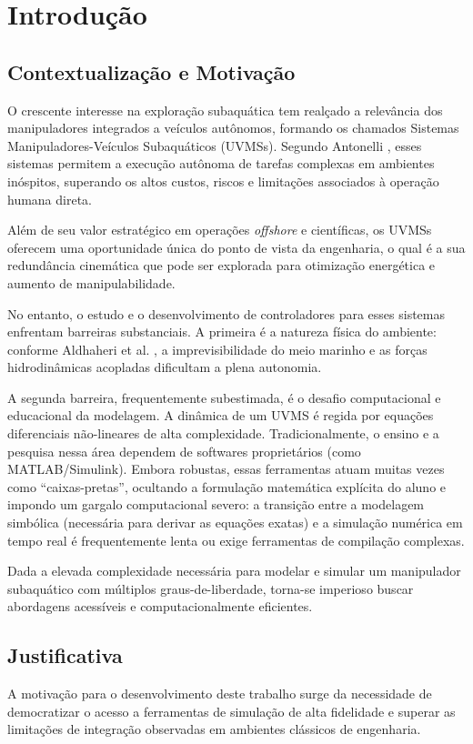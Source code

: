 \chapter{Introdução}

\section{Contextualização e Motivação}
%
O crescente interesse na exploração subaquática tem realçado a relevância dos manipuladores integrados a veículos autônomos, formando os chamados Sistemas Manipuladores-Veículos Subaquáticos (UVMSs). Segundo Antonelli \cite{antonelli2014modelling}, esses sistemas permitem a execução autônoma de tarefas complexas em ambientes inóspitos, superando os altos custos, riscos e limitações associados à operação humana direta. 

Além de seu valor estratégico em operações \textit{offshore} e científicas, os UVMSs oferecem uma oportunidade única do ponto de vista da engenharia, o qual é a sua redundância cinemática que pode ser explorada para otimização energética e aumento de manipulabilidade.

No entanto, o estudo e o desenvolvimento de controladores para esses sistemas enfrentam barreiras substanciais. A primeira é a natureza física do ambiente: conforme Aldhaheri et al. \cite{aldhaheri2022underwater}, a imprevisibilidade do meio marinho e as forças hidrodinâmicas acopladas dificultam a plena autonomia.

A segunda barreira, frequentemente subestimada, é o desafio computacional e educacional da modelagem. A dinâmica de um UVMS é regida por equações diferenciais não-lineares de alta complexidade. Tradicionalmente, o ensino e a pesquisa nessa área dependem de softwares proprietários (como MATLAB/Simulink). Embora robustas, essas ferramentas atuam muitas vezes como ``caixas-pretas'', ocultando a formulação matemática explícita do aluno e impondo um gargalo computacional severo: a transição entre a modelagem simbólica (necessária para derivar as equações exatas) e a simulação numérica em tempo real é frequentemente lenta ou exige ferramentas de compilação complexas.

Dada a elevada complexidade necessária para modelar e simular um manipulador subaquático com múltiplos graus-de-liberdade, torna-se imperioso buscar abordagens acessíveis e computacionalmente eficientes.  

\section{Justificativa}
%
A motivação para o desenvolvimento deste trabalho surge da necessidade de democratizar o acesso a ferramentas de simulação de alta fidelidade e superar as limitações de integração observadas em ambientes clássicos de engenharia.

